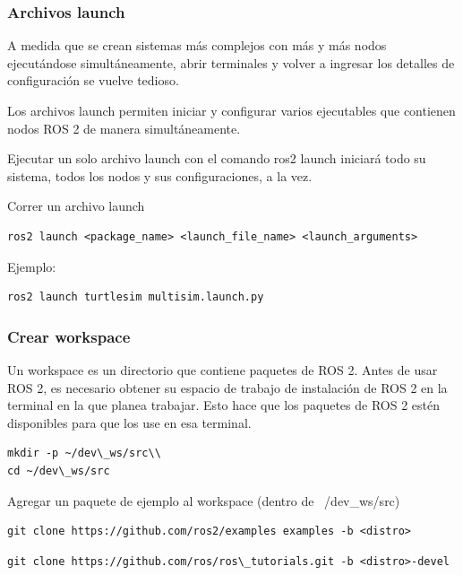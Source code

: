 \begin{frame}[fragile]
	\frametitle{Archivos launch}
	
	A medida que se crean sistemas más complejos con más y más nodos ejecutándose simultáneamente, abrir terminales y volver a ingresar los detalles de configuración se vuelve tedioso.
	
	Los archivos launch permiten iniciar y configurar varios ejecutables que contienen nodos ROS 2 de manera simultáneamente.
	
	Ejecutar un solo archivo launch con el comando ros2 launch iniciará todo su sistema, todos los nodos y sus configuraciones, a la vez.
	
Correr un archivo launch
\begin{lstlisting}[style=bash] 
ros2 launch <package_name> <launch_file_name> <launch_arguments>
\end{lstlisting}

Ejemplo:
\begin{lstlisting}[style=bash] 
ros2 launch turtlesim multisim.launch.py
\end{lstlisting}
	
\end{frame}


\begin{frame}[fragile]
    \frametitle{Crear workspace}
    
Un workspace es un directorio que contiene paquetes de ROS 2. Antes de usar ROS 2, es necesario obtener su espacio de trabajo de instalación de ROS 2 en la terminal en la que planea trabajar. Esto hace que los paquetes de ROS 2 estén disponibles para que los use en esa terminal.

\begin{lstlisting}[style=bash] 
mkdir -p ~/dev\_ws/src\\
cd ~/dev\_ws/src
\end{lstlisting}

Agregar un paquete de ejemplo al workspace (dentro de ~/dev\_ws/src)
\begin{lstlisting}[style=bash] 
git clone https://github.com/ros2/examples examples -b <distro>
\end{lstlisting}

\begin{lstlisting}[style=bash] 
git clone https://github.com/ros/ros\_tutorials.git -b <distro>-devel
\end{lstlisting}
	 
\end{frame}


